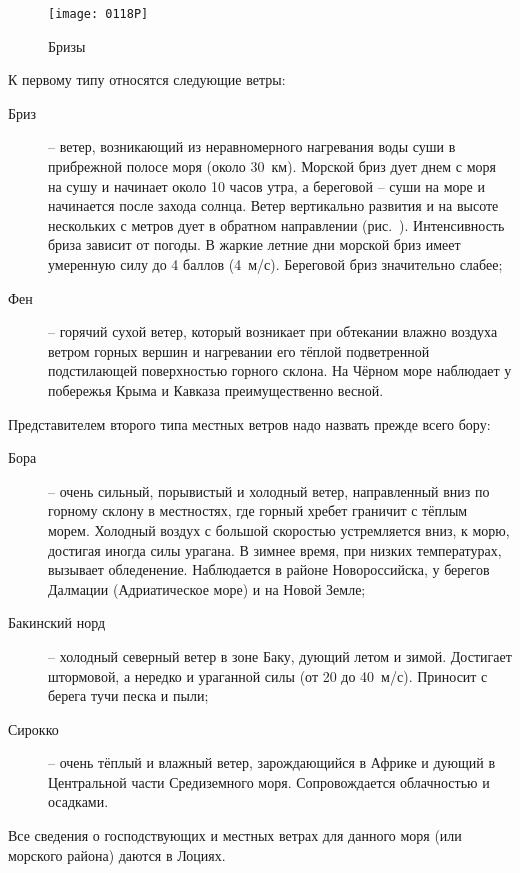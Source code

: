 \begin{figure}[htb]
  \centering{}
  \texttt{[image: 0118P]}
  \caption{Бризы}
  \label{fig:118}
\end{figure}

К первому типу относятся следующие ветры:
\begin{description}
\item [Бриз] \--- ветер, возникающий из неравномерного нагревания воды
  суши в прибрежной полосе моря (около 30~км). Морской бриз
  дует днем с моря на сушу и начинает около 10 часов утра, а береговой
  \--- суши на море и начинается после захода солнца. Ветер
  вертикально развития и на высоте нескольких с метров дует в обратном
  направлении (рис.~). Интенсивность бриза зависит от
  погоды. В жаркие летние дни морской бриз имеет умеренную силу до 4
  баллов (4~м/с). Береговой бриз значительно слабее;
\item[Фен] \--- горячий сухой ветер, который возникает при обтекании
  влажно воздуха ветром горных вершин и нагревании его тёплой
  подветренной подстилающей поверхностью горного склона. На Чёрном
  море наблюдает у побережья Крыма и Кавказа преимущественно весной.
\end{description}

Представителем второго типа местных ветров надо назвать прежде всего
бору:
\begin{description}
\item[Бора] \--- очень сильный, порывистый и холодный
  ветер, направленный вниз по горному склону в местностях, где горный
  хребет граничит с тёплым морем. Холодный воздух с большой скоростью
  устремляется вниз, к морю, достигая иногда силы урагана. В зимнее
  время, при низких температурах, вызывает обледенение. Наблюдается в
  районе Новороссийска, у берегов Далмации (Адриатическое море) и на
  Новой Земле;
\item[Бакинский норд] \--- холодный северный
  ветер в зоне Баку, дующий летом и зимой. Достигает штормовой, а
  нередко и ураганной силы (от 20 до 40~м/с). Приносит с берега тучи
  песка и пыли;
\item[Сирокко] \--- очень тёплый и влажный ветер,
  зарождающийся в Африке и дующий в Центральной части Средиземного
  моря. Сопровождается облачностью и осадками.
\end{description}

Все сведения о господствующих и
местных ветрах для данного моря (или
морского района) даются в Лоциях.

